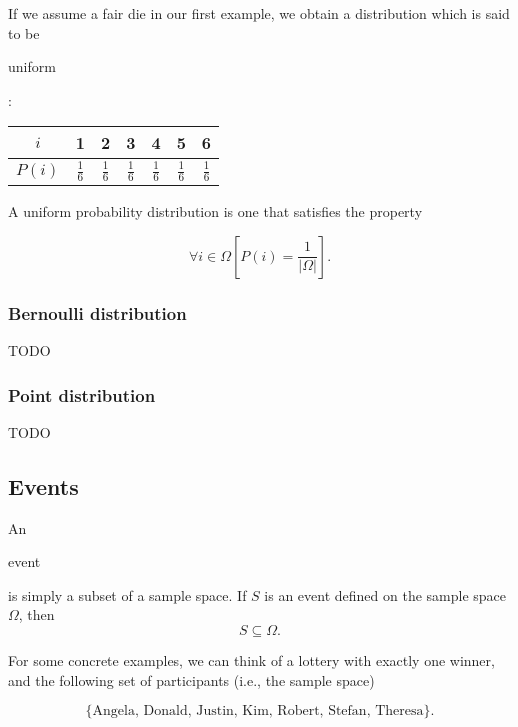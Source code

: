 \documentclass[11pt]{article}
\theoremstyle{plain}
\theoremstyle{definition}
\begin{document}
\noindent If we assume a fair die in our first example, we obtain a distribution which is said to be \begin{em}uniform\end{em}:

\bgroup
\def\arraystretch{1.3}
\begin{center}
\begin{tabular}{c | c c c c c c}
	$i$ & 1 & 2 & 3 & 4 & 5 & 6 \\
	\hline
	$P(i)$ & $\frac{1}{6}$ & $\frac{1}{6}$ & $\frac{1}{6}$ & $\frac{1}{6}$ & $\frac{1}{6}$ & $\frac{1}{6}$
\end{tabular}
\end{center}
\egroup

\noindent A uniform probability distribution is one that satisfies the property

\begin{displaymath}
	\forall i \in \Omega\left[ P(i) = \frac{1}{|\Omega|} \right].
\end{displaymath}

\subsubsection*{Bernoulli distribution}

TODO

\subsubsection*{Point distribution}

TODO

\subsection*{Events}

An \begin{em}event\end{em} is simply a subset of a sample space. If $S$ is an event defined on the sample space $\Omega$, then
\begin{displaymath}
	S \subseteq \Omega.
\end{displaymath}

\noindent For some concrete examples, we can think of a lottery with exactly one
winner, and the following set of participants (i.e., the sample space)

\begin{displaymath}
  \{ \text{Angela, Donald, Justin, Kim, Robert, Stefan, Theresa} \}.
\end{displaymath}
\end{document}
